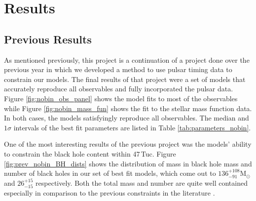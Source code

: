 


\section{Results}



\subsection{Previous Results}

As mentioned previously, this project is a continuation of a project done over the previous year in
which we developed a method to use pulsar timing data to constrain our models. The final results of
that project were a set of models that accurately reproduce all observables and fully incorporated
the pulsar data. Figure \ref{fig:nobin_obs_panel} shows the model fits to most of the observables
while Figure \ref{fig:nobin_mass_fun} shows the fit to the stellar mass function data. In both
cases, the models satisfyingly reproduce all observables. The median and $1\sigma$ intervals of the
best fit parameters are listed in Table \ref{tab:parameters_nobin}.

One of the most interesting results of the previous project was the models' ability to constrain the
black hole content within 47\,Tuc. Figure \ref{fig:prev_nobin_BH_dists} shows the distribution of
mass in black hole mass and number of black holes in our set of best fit models, which come out to
$136^{+108}_{-91} \mathrm{M}_\odot$ and $26^{+15}_{-15}$ respectively. Both the total mass and
number are quite well contained especially in comparison to the previous constraints in the
literature \citep[see e.g.][]{Henault-Brunet2020,Weatherford2019}.




